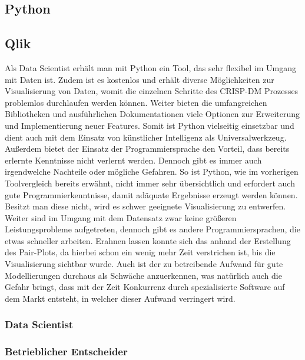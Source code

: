 \documentclass[12pt]{article}
\begin{document}
	\subsection{Python}
	
	\subsection{Qlik}
	
	Als Data Scientist erhält man mit Python ein Tool, das sehr flexibel im Umgang mit Daten
	ist. Zudem ist es kostenlos und erhält diverse Möglichkeiten zur Visualisierung von
	Daten, womit die einzelnen Schritte des CRISP-DM Prozesses problemlos durchlaufen
	werden können.
	Weiter bieten die umfangreichen Bibliotheken und ausführlichen Dokumentationen
	viele Optionen zur Erweiterung und Implementierung neuer Features. Somit ist Python
	vielseitig einsetzbar und dient auch mit dem Einsatz von künstlicher Intelligenz als
	Universalwerkzeug.
	Außerdem bietet der Einsatz der Programmiersprache den Vorteil, dass bereits erlernte
	Kenntnisse nicht verlernt werden.
	Dennoch gibt es immer auch irgendwelche Nachteile oder mögliche Gefahren.
	So ist Python, wie im vorherigen Toolvergleich bereits erwähnt, nicht immer sehr
	übersichtlich und erfordert auch gute Programmierkenntnisse, damit adäquate
	Ergebnisse erzeugt werden können. Besitzt man diese nicht, wird es schwer geeignete
	Visualisierung zu entwerfen.
	Weiter sind im Umgang mit dem Datensatz zwar keine größeren Leistungsprobleme
	aufgetreten, dennoch gibt es andere Programmiersprachen, die etwas schneller
	arbeiten. Erahnen lassen konnte sich das anhand der Erstellung des Pair-Plots, da
	hierbei schon ein wenig mehr Zeit verstrichen ist, bis die Visualisierung sichtbar wurde.
	Auch ist der zu betreibende Aufwand für gute Modellierungen durchaus als Schwäche
	anzuerkennen, was natürlich auch die Gefahr bringt, dass mit der Zeit Konkurrenz durch
	spezialisierte Software auf dem Markt entsteht, in welcher dieser Aufwand verringert wird.
	
	\subsubsection{Data Scientist}
	
	\subsubsection{Betrieblicher Entscheider}
	
\end{document}
